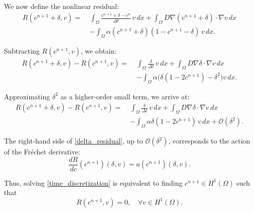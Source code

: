 \documentclass[12pt, a4paper, twoside, openright]{report}
\begin{document}
We now define the nonlinear residual:
\begin{equation}
  \label{residual}
  \begin{aligned}
    R(c^{n+1} + \delta, v) =\; & \int_{\Omega} \frac{c^{n+1} + \delta - c^n}{\Delta t} \, v \, dx
    + \int_{\Omega} D \nabla (c^{n+1} + \delta) \cdot \nabla v \, dx                                          \\
                               & - \int_{\Omega} \alpha (c^{n+1} + \delta)(1 - c^{n+1} - \delta) \, v \, dx .
  \end{aligned}
\end{equation}

Subtracting $R(c^{n+1}, v)$, we obtain:
\begin{equation}
  \label{difference_residual}
  \begin{aligned}
    R(c^{n+1} + \delta, v) - R(c^{n+1}, v) =\; &
    \int_{\Omega} \frac{\delta}{\Delta t} \, v \, dx
    + \int_{\Omega} D \nabla \delta \cdot \nabla v \, dx                                                                         \\
                                               & - \int_{\Omega} \alpha \bigl( \delta (1 - 2c^{n+1}) - \delta^2 \bigr) v \, dx .
  \end{aligned}
\end{equation}

Approximating $\delta^2$ as a higher-order small term, we arrive at:
\begin{equation}
  \label{delta_residual}
  \begin{aligned}
    R(c^{n+1} + \delta, v) - R(c^{n+1}, v) =\; &
    \int_{\Omega} \frac{\delta}{\Delta t} \, v \, dx
    + \int_{\Omega} D \nabla \delta \cdot \nabla v \, dx                                                  \\
                                               & - \int_{\Omega} \alpha \delta (1  - 2c^{n+1}) \, v \, dx
    + \mathcal{O}(\delta^2).
  \end{aligned}
\end{equation}

The right-hand side of \autoref{delta_residual}, up to $\mathcal{O}(\delta^2)$, corresponds to the action of the Fréchet derivative:
\[
  \frac{dR}{dc}(c^{n+1})(\delta, v) = a(c^{n+1})(\delta, v).
\]

Thus, solving \autoref{time_discretization} is equivalent to finding $c^{n+1} \in H^1(\Omega)$ such that
\[
  R(c^{n+1}, v) = 0, \quad \forall v \in H^1(\Omega).
\]
\end{document}
